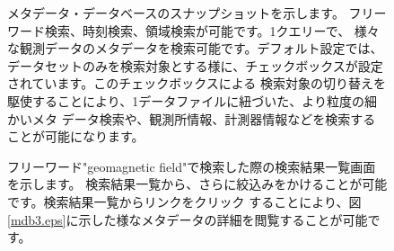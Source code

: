 \begin{figure}[H]
\begin{center}
\caption{メタデータ・データベースのスナップショットを示します。
フリーワード検索、時刻検索、領域検索が可能です。1クエリーで、
様々な観測データのメタデータを検索可能です。デフォルト設定では、
データセットのみを検索対象とする様に、チェックボックスが設定されています。このチェックボックスによる
検索対象の切り替えを駆使することにより、1データファイルに紐づいた、より粒度の細かいメタ
データ検索や、観測所情報、計測器情報などを検索することが可能になります。}
\label{mdb1.eps}
\end{center}
\end{figure}

\begin{figure}[H]
\begin{center}
\caption{フリーワード"geomagnetic field"で検索した際の検索結果一覧画面を示します。
検索結果一覧から、さらに絞込みをかけることが可能です。検索結果一覧からリンクをクリック
することにより、図\ref{mdb3.eps}に示した様なメタデータの詳細を閲覧することが可能です。}
\label{mdb2.eps}
\end{center}
\end{figure}

